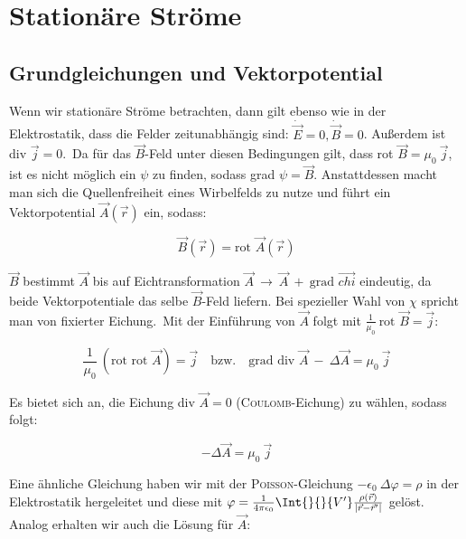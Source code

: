\chapter{Stationäre Ströme}

\section{Grundgleichungen und Vektorpotential}

Wenn wir stationäre Ströme betrachten, dann gilt ebenso wie in der Elektrostatik, dass die Felder zeitunabhängig sind: $\dot{\vec{E}} = 0, \dot{\vec{B}}=0$. Außerdem ist div $\vec{j} = 0$.\
Da für das $\vec{B}$-Feld unter diesen Bedingungen gilt, dass rot $\vec{B} = \mu_0 \ \vec{j}$, ist es nicht möglich ein $\psi$ zu finden, sodass grad $\psi = \vec{B}$. Anstattdessen macht man sich die Quellenfreiheit eines Wirbelfelds zu nutze und führt ein Vektorpotential $\vec{A}(\vec{r})$ ein, sodass:

\begin{equation*}
\vec{B}(\vec{r}) = \text{rot } \vec{A}(\vec{r})
\end{equation*}

$\vec{B}$ bestimmt $\vec{A}$ bis auf Eichtransformation $\vec{A}\ \rightarrow \ \vec{A} \ + \ \text{grad } \vec{chi}$ eindeutig, da beide Vektorpotentiale das selbe $\vec{B}$-Feld liefern. Bei spezieller Wahl von $\chi$ spricht man von fixierter Eichung.\
Mit der Einführung von $\vec{A}$ folgt mit $\frac{1}{\mu_0}\ \text{rot } \vec{B} = \vec{j}$:

\begin{equation*}
\frac{1}{\mu_0}\ (\text{rot rot }\vec{A})=\vec{j} \quad \text{bzw.} \quad \text{grad div }\vec{A}\ - \ \Delta\vec{A}=\mu_0 \ \vec{j}
\end{equation*}

Es bietet sich an, die Eichung div $\vec{A} = 0$ (\textsc{Coulomb}-Eichung) zu wählen, sodass folgt:

\begin{equation*}
-\Delta\vec{A}=\mu_0 \ \vec{j}
\end{equation*}

Eine ähnliche Gleichung haben wir mit der \textsc{Poisson}-Gleichung $-\epsilon_0 \ \Delta\varphi = \rho$ in der Elektrostatik hergeleitet und diese mit $\varphi = \frac{1}{4\pi\epsilon_0}\Int{}{}{V'}\frac{\rho(\vec{r})}{|\vec{r}-\vec{r}'|}$ gelöst.\ \\
Analog erhalten wir auch die Lösung für $\vec{A}$:

